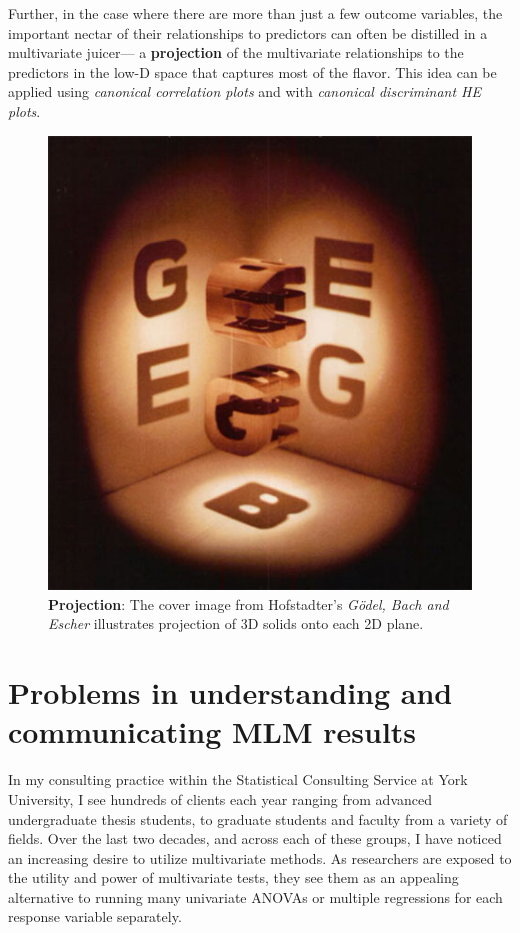 \documentclass[
  letterpaper,
  10pt,
  krantz2]{krantz}
\begin{document}
Further, in the case where there are more than just a few outcome
variables, the important nectar of their relationships to predictors can
often be distilled in a multivariate juicer--- a \textbf{projection} of
the multivariate relationships to the predictors in the low-D space that
captures most of the flavor. This idea can be applied using
\emph{canonical correlation plots} and with \emph{canonical discriminant
HE plots}.

\begin{figure}[H]

{\centering \includegraphics{images/Cover-GBE.png}

}

\caption{\textbf{Projection}: The cover image from Hofstadter's
\emph{Gödel, Bach and Escher} illustrates projection of 3D solids onto
each 2D plane.}

\end{figure}%

\section{Problems in understanding and communicating MLM
results}\label{sec-problems}

In my consulting practice within the Statistical Consulting Service at
York University, I see hundreds of clients each year ranging from
advanced undergraduate thesis students, to graduate students and faculty
from a variety of fields. Over the last two decades, and across each of
these groups, I have noticed an increasing desire to utilize
multivariate methods. As researchers are exposed to the utility and
power of multivariate tests, they see them as an appealing alternative
to running many univariate ANOVAs or multiple regressions for each
response variable separately.
\end{document}
